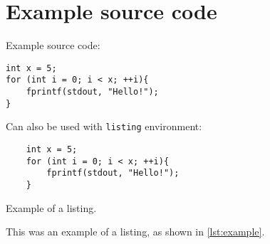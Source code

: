 \section{Example source code}
Example source code:
\begin{verbatim}
int x = 5;
for (int i = 0; i < x; ++i){
    fprintf(stdout, "Hello!");
}
\end{verbatim}

Can also be used with \texttt{listing} environment:

\begin{listing}[H]
    \begin{verbatim}
    int x = 5;
    for (int i = 0; i < x; ++i){
        fprintf(stdout, "Hello!");
    }
    \end{verbatim}
    \caption{Example of a listing.}
    \label{lst:example}
\end{listing}

This was an example of a listing, as shown in \ref{lst:example}.